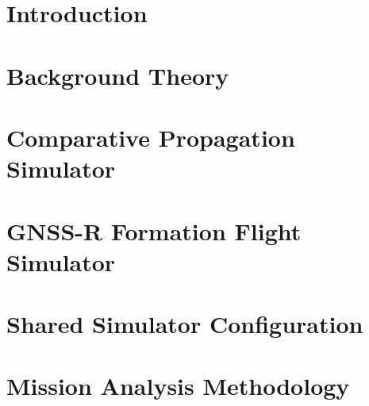 \documentclass[a4paper, 12pt, openany, oneside]{book} %
\begin{document}
% 

\chapter{Introduction}
\label{chap:introduction}

\cleardoublepage

% 


\chapter{Background Theory}
\label{chap:theory}

\cleardoublepage


\chapter{Comparative Propagation Simulator}
\label{chap:propagator}

\cleardoublepage


\chapter{GNSS-R Formation Flight Simulator}
\label{chap:lifetime}

\cleardoublepage


\chapter{Shared Simulator Configuration}
\label{chap:shared}

\cleardoublepage


\chapter{Mission Analysis Methodology}
\label{chap:experiments}

\cleardoublepage
\end{document}
